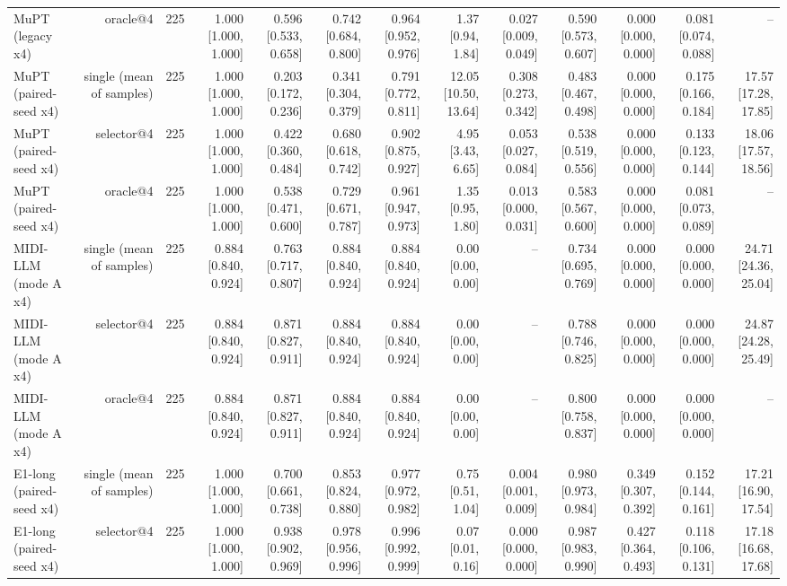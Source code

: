 \begin{table}[t]
\begin{tabular}{lrrrrrrrrrrrr}
MuPT (legacy x4) & oracle@4 & 225 & 1.000 [1.000, 1.000] & 0.596 [0.533, 0.658] & 0.742 [0.684, 0.800] & 0.964 [0.952, 0.976] & 1.37 [0.94, 1.84] & 0.027 [0.009, 0.049] & 0.590 [0.573, 0.607] & 0.000 [0.000, 0.000] & 0.081 [0.074, 0.088] & – \\
MuPT (paired-seed x4) & single (mean of samples) & 225 & 1.000 [1.000, 1.000] & 0.203 [0.172, 0.236] & 0.341 [0.304, 0.379] & 0.791 [0.772, 0.811] & 12.05 [10.50, 13.64] & 0.308 [0.273, 0.342] & 0.483 [0.467, 0.498] & 0.000 [0.000, 0.000] & 0.175 [0.166, 0.184] & 17.57 [17.28, 17.85] \\
MuPT (paired-seed x4) & selector@4 & 225 & 1.000 [1.000, 1.000] & 0.422 [0.360, 0.484] & 0.680 [0.618, 0.742] & 0.902 [0.875, 0.927] & 4.95 [3.43, 6.65] & 0.053 [0.027, 0.084] & 0.538 [0.519, 0.556] & 0.000 [0.000, 0.000] & 0.133 [0.123, 0.144] & 18.06 [17.57, 18.56] \\
MuPT (paired-seed x4) & oracle@4 & 225 & 1.000 [1.000, 1.000] & 0.538 [0.471, 0.600] & 0.729 [0.671, 0.787] & 0.961 [0.947, 0.973] & 1.35 [0.95, 1.80] & 0.013 [0.000, 0.031] & 0.583 [0.567, 0.600] & 0.000 [0.000, 0.000] & 0.081 [0.073, 0.089] & – \\
MIDI-LLM (mode A x4) & single (mean of samples) & 225 & 0.884 [0.840, 0.924] & 0.763 [0.717, 0.807] & 0.884 [0.840, 0.924] & 0.884 [0.840, 0.924] & 0.00 [0.00, 0.00] & – & 0.734 [0.695, 0.769] & 0.000 [0.000, 0.000] & 0.000 [0.000, 0.000] & 24.71 [24.36, 25.04] \\
MIDI-LLM (mode A x4) & selector@4 & 225 & 0.884 [0.840, 0.924] & 0.871 [0.827, 0.911] & 0.884 [0.840, 0.924] & 0.884 [0.840, 0.924] & 0.00 [0.00, 0.00] & – & 0.788 [0.746, 0.825] & 0.000 [0.000, 0.000] & 0.000 [0.000, 0.000] & 24.87 [24.28, 25.49] \\
MIDI-LLM (mode A x4) & oracle@4 & 225 & 0.884 [0.840, 0.924] & 0.871 [0.827, 0.911] & 0.884 [0.840, 0.924] & 0.884 [0.840, 0.924] & 0.00 [0.00, 0.00] & – & 0.800 [0.758, 0.837] & 0.000 [0.000, 0.000] & 0.000 [0.000, 0.000] & – \\
E1-long (paired-seed x4) & single (mean of samples) & 225 & 1.000 [1.000, 1.000] & 0.700 [0.661, 0.738] & 0.853 [0.824, 0.880] & 0.977 [0.972, 0.982] & 0.75 [0.51, 1.04] & 0.004 [0.001, 0.009] & 0.980 [0.973, 0.984] & 0.349 [0.307, 0.392] & 0.152 [0.144, 0.161] & 17.21 [16.90, 17.54] \\
E1-long (paired-seed x4) & selector@4 & 225 & 1.000 [1.000, 1.000] & 0.938 [0.902, 0.969] & 0.978 [0.956, 0.996] & 0.996 [0.992, 0.999] & 0.07 [0.01, 0.16] & 0.000 [0.000, 0.000] & 0.987 [0.983, 0.990] & 0.427 [0.364, 0.493] & 0.118 [0.106, 0.131] & 17.18 [16.68, 17.68] \\

\end{tabular}
\end{table}
